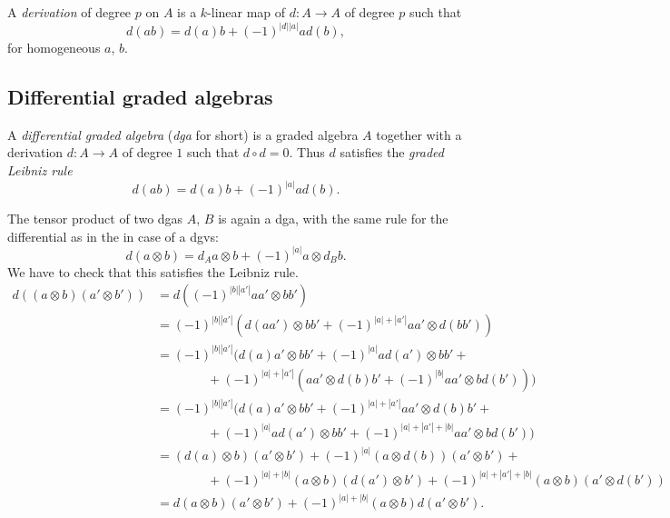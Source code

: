 \documentclass[english,no-theorem-numbers]{short-notes}
\newcommand\degree[1]{|#1|}
\newenvironment{verification}{\footnotesize\color{gray}}{}
\begin{document}
A \emph{derivation} of degree $p$ on $A$ is a $k$-linear map of $d\colon A → A$ of degree $p$ such that
\[
d(ab) = d(a)b + (-1)^{\degree d \degree a} a d(b),
\]
for homogeneous $a$, $b$.

\subsection{Differential graded algebras}

A \emph{differential graded algebra} (\emph{dga} for short) is a graded algebra $A$ together with a derivation $d\colon A → A$ of degree $1$ such that $d ∘ d = 0$.
Thus $d$ satisfies the \emph{graded Leibniz rule} 
\[
d(ab) = d(a)b + (-1)^{\degree a} ad(b).
\]

The tensor product of two dgas $A$, $B$ is again a dga, with the same rule for the differential as in the in case of a dgvs:
\[
d(a \otimes b) = d_Aa \otimes b + (-1)^{\degree a} a \otimes d_B b.
\]
\begin{verification}
    We have to check that this satisfies the Leibniz rule.
    \begin{align*}
    d( (a \otimes b)(a'\otimes b')) & =
    d\left(  (-1)^{\degree b \degree{a'}} aa' \otimes bb' \right) \\ & =
    (-1)^{\degree b \degree{a'}} \left( d(aa') \otimes bb' + (-1)^{\degree a + \degree{a'}} aa' \otimes d(bb') \right) \\ & =
    (-1)^{\degree b \degree{a'}} \biggl( d(a)a' \otimes bb' + (-1)^{\degree a} ad(a') \otimes bb' + \\
        &\qquad\qquad + (-1)^{\degree a + \degree{a'}} \left( aa' \otimes d(b)b' + (-1)^{\degree b} aa' \otimes bd(b') \right) \biggr) \\ & =
    (-1)^{\degree b \degree{a'}} \biggl( d(a)a' \otimes bb' + (-1)^{\degree a + \degree{a'}} aa' \otimes d(b)b' + \\
        &\qquad\qquad + (-1)^{\degree a} ad(a') \otimes bb' + (-1)^{\degree a + \degree{a'} + \degree b}aa' \otimes bd(b') \biggr)\\ & =
    (d(a) \otimes b)(a' \otimes b') + (-1)^{\degree a}(a \otimes d(b))(a' \otimes b') + \\
        &\qquad\qquad + (-1)^{\degree a + \degree b} (a \otimes b)(d(a') \otimes b') + (-1)^{\degree a + \degree{a'} + \degree b} (a \otimes b)(a' \otimes d(b')) \\ & =
    d(a \otimes b)(a' \otimes b') + (-1)^{\degree a + \degree b}(a \otimes b)d(a' \otimes b').
\end{align*}%
\end{verification}%
\end{document}
